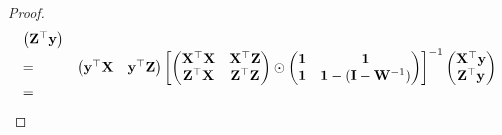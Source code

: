 \documentclass{amsart}[12pt]
\begin{document}
\begin{proof}
\begin{equation*}
\begin{array}{ll}
\begin{pmatrix}
			{\bf Z}^\top {\bf y}
			\end{pmatrix} \\
			=                                                                      &                                                                                                                                                                                                         
			\begin{pmatrix}
			{\bf y}^\top {\bf X}                                                           & {\bf y}^\top {\bf Z}                                                                                                                                                                                            
			\end{pmatrix}
			\begin{bmatrix}
			\begin{pmatrix}
			{\bf X}^\top {\bf X}                                                           & {\bf X}^\top {\bf Z}                                                                                                                                                                                            \\
			{\bf Z}^\top {\bf X}                                                           & {\bf Z}^\top {\bf Z}                                                                                                                                                                                            
			\end{pmatrix}
			\odot
			\begin{pmatrix}
			{\bf1}                                                                  & {\bf 1}                                                                                                                                                                                                   \\
			{\bf 1}                                                                  & {\bf 1} - ({\bf I} - {\bf W}^{-1})                                                                                                                                                                                
			\end{pmatrix}
			\end{bmatrix}
			^{-1}
			\begin{pmatrix}
			{\bf X}^\top {\bf y}\\
			{\bf Z}^\top {\bf y}
			\end{pmatrix} \\
			=                                                                      &                                                                                                                                                                                                         

\end{array}
\end{equation*}
\end{proof}
\end{document}
